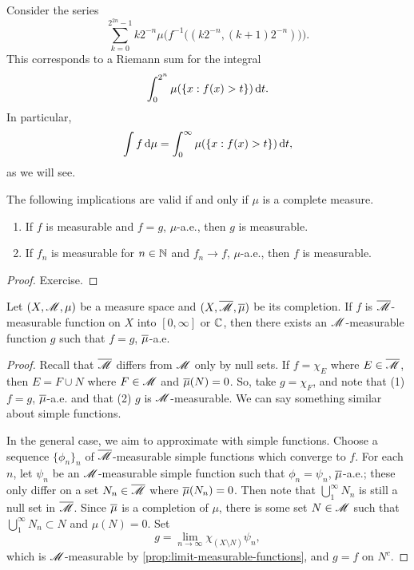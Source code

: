 \documentclass[12pt]{article} %
\begin{document}
\begin{remark}
    Consider the series
    \[\sum_{k=0}^{2^{2n} - 1} k2^{-n} \mu\Big( f^{-1}\Big((k2^{-n}, (k+1)2^{-n})\Big)\Big).\] This corresponds to a Riemann sum for the integral \[\int_0^{2^n} \mu(\{x : f(x) > t\}) \, \mathrm{d} t.\] In particular, \[\int f \, \mathrm{d} \mu = \int_0^\infty \mu(\{x : f(x) > t\}) \, \mathrm{d} t,\] as we will see.
\end{remark} 

\begin{proposition}
    The following implications are valid if and only if $\mu$ is a complete measure. \begin{enumerate}
        \item If $f$ is measurable and $f = g$, $\mu$-a.e., then $g$ is measurable.
        \item If $f_n$ is measurable for $n \in \mathbb{N}$ and $f_n \to f$, $\mu$-a.e., then $f$ is measurable.
    \end{enumerate}
\end{proposition}

\begin{proof}
    Exercise.
\end{proof}

\begin{proposition}\label{prop:equal-ae-function-complete-measure}
    Let $(X, \mathscr{M}, \mu)$ be a measure space and $(X, \overline{\mathscr{M}}, \overline{\mu})$ be its completion. If $f$ is $\overline{\mathscr{M}}$-measurable function on $X$ into $[0,\infty]$ or $ \mathbb{C}$, then there exists an $\mathscr{M}$-measurable function $g$ such that $f = g$, $\overline{\mu}$-a.e.
\end{proposition}

\begin{proof}
    Recall that $\overline{\mathscr{M}}$ differs from $\mathscr{M}$ only by null sets. If $f = \chi_E$ where $E \in \overline{\mathscr{M}}$, then $E = F \cup N$ where $F \in \mathscr{M}$ and $\overline{\mu}(N) = 0$. So, take $g = \chi_F$, and note that (1) $f = g$, $\overline{\mu}$-a.e. and that (2) $g$ is $\mathscr{M}$-measurable. We can say something similar about simple functions. 

    In the general case, we aim to approximate with simple functions. Choose a sequence $\{\phi_n\}_n$ of $\overline{\mathscr{M}}$-measurable simple functions which converge to $f$. For each $n$, let $\psi_n$ be an $\mathscr{M}$-measurable simple function such that $\phi_n = \psi_n$, $\overline{\mu}$-a.e.; these only differ on a set $N_n \in \overline{\mathscr{M}}$ where $\overline{\mu}(N_n) = 0$. Then note that $\bigcup_1^\infty N_n$ is still a null set in $\overline{\mathscr{M}}$. Since $\overline{\mu}$ is a completion of $\mu$, there is some set $N \in \mathscr{M}$ such that $\bigcup_1^\infty N_n \subset N$ and $\mu(N) = 0$. Set \[g = \lim_{n \to \infty} \chi_{(X \setminus N)} \psi_n,\] which is $\mathscr{M}$-measurable by \cref{prop:limit-measurable-functions}, and $g = f$ on $N^c$.
\end{proof}
\end{document}
